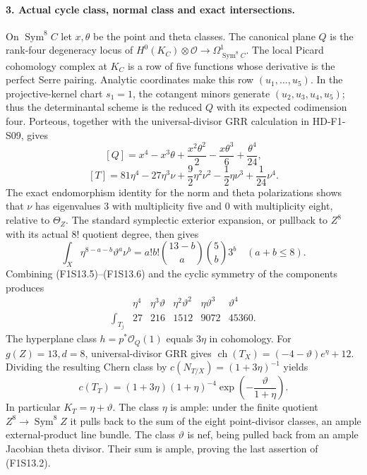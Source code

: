 \paragraph{3. Actual cycle class, normal class and exact intersections.}
On $\operatorname{Sym}^8C$ let $x,\theta$ be the point and theta classes.
The canonical plane $Q$ is the rank-four degeneracy locus of
$H^0(K_C)\otimes\mathcal O\to\Omega^1_{\operatorname{Sym}^8C}$.
The local Picard cohomology complex at $K_C$ is a row of five functions
whose derivative is the perfect Serre pairing. Analytic coordinates
make this row $(u_1,\ldots,u_5)$. In the projective-kernel chart $s_1=1$,
the cotangent minors generate $(u_2,u_3,u_4,u_5)$; thus the determinantal
scheme is the reduced $Q$ with its expected codimension four.
Porteous, together with the universal-divisor GRR calculation in
HD-F1-S09, gives
\[
 [Q]=x^4-x^3\theta+\frac{x^2\theta^2}{2}
                    -\frac{x\theta^3}{6}+\frac{\theta^4}{24},
\]
\[
 [T]=81\eta^4-27\eta^3\nu+\frac92\eta^2\nu^2
                         -\frac12\eta\nu^3+\frac1{24}\nu^4.
 \tag{F1S13.5}
\]
The exact endomorphism identity for the norm and theta polarizations
shows that $\nu$ has eigenvalues $3$ with multiplicity five and $0$ with
multiplicity eight, relative to $\Theta_Z$. The standard symplectic
exterior expansion, or pullback to $Z^8$ with its actual $8!$ quotient
degree, then gives
\[
 \int_X\eta^{8-a-b}\vartheta^a\nu^b
       =a!b!\binom{13-b}{a}\binom5b3^b\quad(a+b\leq8).
 \tag{F1S13.6}
\]
Combining (F1S13.5)--(F1S13.6) and the cyclic symmetry of the components
produces
\[
 \begin{array}{c|rrrrr}
  &\eta^4&\eta^3\vartheta&\eta^2\vartheta^2&\eta\vartheta^3&\vartheta^4\\\hline
 \displaystyle\int_{T_j}&27&216&1512&9072&45360.
 \end{array}
 \tag{F1S13.7}
\]
The hyperplane class $h=p^*\mathcal O_Q(1)$ equals $3\eta$ in cohomology.
For $g(Z)=13,d=8$, universal-divisor GRR gives
$\operatorname{ch}(T_X)=(-4-\vartheta)e^\eta+12$. Dividing the resulting
Chern class by $c(N_{T/X})=(1+3\eta)^{-1}$ yields
\[
             c(T_T)=(1+3\eta)(1+\eta)^{-4}
                            \exp\left(-\frac{\vartheta}{1+\eta}\right).
 \tag{F1S13.8}
\]
In particular $K_T=\eta+\vartheta$. The class $\eta$ is ample: under
the finite quotient $Z^8\to\operatorname{Sym}^8Z$ it pulls back to the
sum of the eight point-divisor classes, an ample external-product line
bundle. The class $\vartheta$ is nef, being pulled back from an ample
Jacobian theta divisor. Their sum is ample, proving the last assertion
of (F1S13.2).

